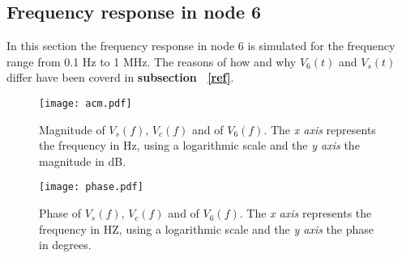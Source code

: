 \subsection{ Frequency response in node 6}
In this section the frequency response in node 6 is simulated for the frequency range from 0.1 Hz to 1 MHz. 
The reasons of how and why $V_{6}(t)$ and $V_{s}(t)$ differ have been coverd in \textbf{subsection ~\ref{ref}}.\par
\begin{figure}[H] \centering
\texttt{[image: acm.pdf]}
\caption{Magnitude of $V_s(f)$, $V_c(f)$  and of $V_6(f)$. The \textit{x axis} represents the frequency in Hz, using a logarithmic scale and the \textit{y axis} the magnitude in dB.}
\label{fig:Magnitude}
\end{figure}
\pagebreak
\par
\begin{figure}[H] \centering
\texttt{[image: phase.pdf]}
\caption{Phase of $V_s(f)$, $V_c(f)$ and of $V_6(f)$. The \textit{x axis} represents the frequency in HZ, using a logarithmic scale and the \textit{y axis} the phase in degrees.}  
\label{fig:phase}
\end{figure}

\pagebreak
